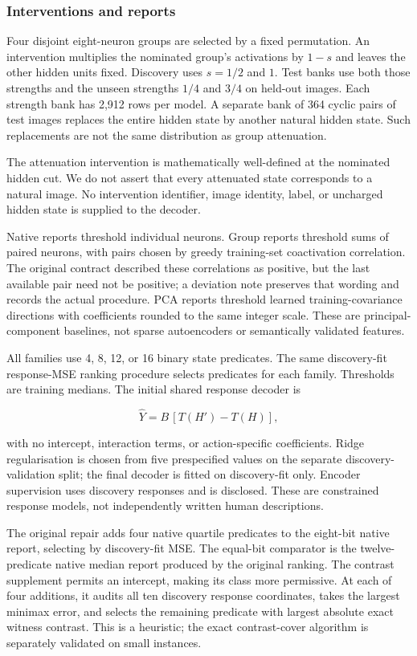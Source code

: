 \documentclass[
  british,
  11pt,
  a4paper,
]{article}
\begin{document}
\subsubsection{Interventions and
reports}\label{interventions-and-reports}

Four disjoint eight-neuron groups are selected by a fixed permutation.
An intervention multiplies the nominated group's activations by \(1-s\)
and leaves the other hidden units fixed. Discovery uses \(s=1/2\) and
\(1\). Test banks use both those strengths and the unseen strengths
\(1/4\) and \(3/4\) on held-out images. Each strength bank has 2,912
rows per model. A separate bank of 364 cyclic pairs of test images
replaces the entire hidden state by another natural hidden state. Such
replacements are not the same distribution as group attenuation.

The attenuation intervention is mathematically well-defined at the
nominated hidden cut. We do not assert that every attenuated state
corresponds to a natural image. No intervention identifier, image
identity, label, or uncharged hidden state is supplied to the decoder.

Native reports threshold individual neurons. Group reports threshold
sums of paired neurons, with pairs chosen by greedy training-set
coactivation correlation. The original contract described these
correlations as positive, but the last available pair need not be
positive; a deviation note preserves that wording and records the actual
procedure. PCA reports threshold learned training-covariance directions
with coefficients rounded to the same integer scale. These are
principal-component baselines, not sparse autoencoders or semantically
validated features.

All families use 4, 8, 12, or 16 binary state predicates. The same
discovery-fit response-MSE ranking procedure selects predicates for each
family. Thresholds are training medians. The initial shared response
decoder is

\[\widehat Y=B\,[T(H')-T(H)],\]

with no intercept, interaction terms, or action-specific coefficients.
Ridge regularisation is chosen from five prespecified values on the
separate discovery-validation split; the final decoder is fitted on
discovery-fit only. Encoder supervision uses discovery responses and is
disclosed. These are constrained response models, not independently
written human descriptions.

The original repair adds four native quartile predicates to the
eight-bit native report, selecting by discovery-fit MSE. The equal-bit
comparator is the twelve-predicate native median report produced by the
original ranking. The contrast supplement permits an intercept, making
its class more permissive. At each of four additions, it audits all ten
discovery response coordinates, takes the largest minimax error, and
selects the remaining predicate with largest absolute exact witness
contrast. This is a heuristic; the exact contrast-cover algorithm is
separately validated on small instances.
\end{document}
